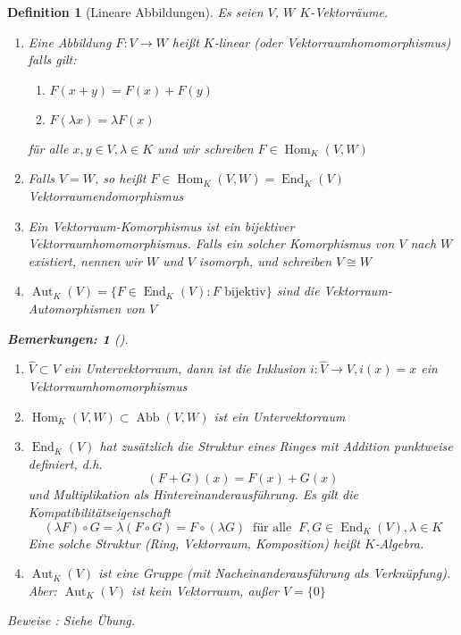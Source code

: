 \documentclass{report}
\newcommand{\IN}[1]{\index{#1|BH}}
\newcommand{\lb}{\lambda}
\DeclareMathOperator{\abb}{Abb}
\DeclareMathOperator{\Hom}{Hom}
\DeclareMathOperator{\End}{End}
\DeclareMathOperator{\Aut}{Aut}
\theoremstyle{customrem}
\newtheorem*{bemerkung2}{Bemerkungen\textnormal:}
\newenvironment{bemerkungen}[1][]{\begin{bemerkung2}[#1]\leavevmode}{\end{bemerkung2}}
\theoremstyle{customdef}
\newtheorem{definition}{Definition}[chapter]
\begin{document}
	\begin{definition}[Lineare Abbildungen]
		\label{def31}
		\IN{Lineare Abbildung}
		Es seien $V$, $W$ $K$-Vektorräume.
		\begin{enumerate}
			\item Eine Abbildung $F : V \to W$ heißt $K$-linear (oder \textsl{Vektorraumhomomorphismus}) falls gilt:
			\begin{enumerate}[leftmargin=5cm]
				\item $F(x + y) = F(x) + F(y)$
				\item $F(\lb x) = \lb F(x)$
			\end{enumerate}
			für alle $x, y \in V, \lb \in K$ und wir schreiben $F \in \Hom_K(V, W)$
			
			\item Falls $V = W$, so heißt $F \in \Hom_K(V, W) = \End_K(V)$ \textsl{Vektorraumendomorphismus}
			\item Ein Vektorraum-\textsl{Komorphismus} ist ein bijektiver Vektorraumhomomorphismus. Falls ein solcher Komorphismus von $V$ nach $W$ existiert, nennen wir $W$ und $V$ isomorph, und schreiben $V \cong W$
			\item $\Aut_K(V) = \{F \in \End_K(V) : F \text{ bijektiv}\}$ sind die Vektorraum-\textsl{Automorphismen} von $V$
		\end{enumerate}
		\vspace{.1cm}
		\begin{bemerkungen}
			\begin{enumerate}
				\item $\hat{V} \subset V$ ein Untervektorraum, dann ist die Inklusion $i : \hat{V} \to V, i(x) = x$ ein Vektorraumhomomorphismus
				\item $\Hom_K(V, W) \subset \abb(V, W)$ ist ein Untervektorraum
				\item $\End_K(V)$ hat zusätzlich die Struktur eines Ringes mit Addition punktweise definiert, d.h. $$(F + G)(x) = F(x) + G(x)$$ und Multiplikation als Hintereinanderausführung.
				Es gilt die Kompatibilitätseigenschaft
				$$(\lb F) \circ G = \lb (F \circ G) = F \circ (\lb G)\ \text{ für alle }\ F, G \in \End_K(V), \lb \in K$$
				Eine solche Struktur (Ring, Vektorraum, Komposition) heißt $K$-Algebra.
				
				\item $\Aut_K(V)$ ist eine Gruppe (mit Nacheinanderausführung als Verknüpfung). Aber: $\Aut_K(V)$ ist kein Vektorraum, außer $V = \{0\}$
			\end{enumerate}
		\end{bemerkungen}
		Beweise : Siehe Übung.\\
		

\end{definition}
\end{document}
